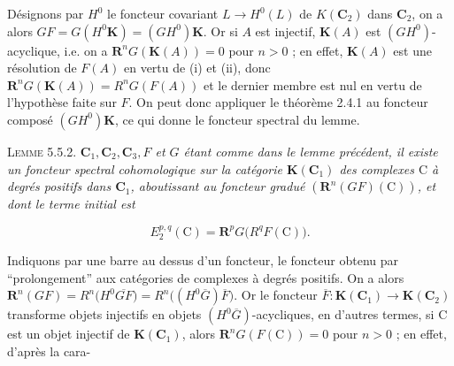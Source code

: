 Désignons par $H^0$ le foncteur covariant $L\to H^0(L)$ de
$K({\mathbf C}_2)$ dans ${\mathbf C}_2$, on a alors
$GF=G(H^0\mathbf K)=(GH^0)\mathbf K$. Or si $A$ est injectif, $\mathbf K(A)$
est $(GH^0)$-acyclique, i.e. on a ${\mathbf R}^nG(\mathbf K(A))=0$ pour $n>0$ ; en
effet, $\mathbf K(A)$ est une résolution de $F(A)$ en vertu de (i) et (ii),
donc ${\mathbf R}^nG(\mathbf K(A))=R^nG(F(A))$ et le dernier membre est nul en vertu de
l'hypothèse faite sur $F$. On peut donc appliquer le théorème 2.4.1 au
foncteur composé $(GH^0)\mathbf K$, ce qui donne le foncteur spectral du lemme.

\textsc{Lemme 5.5.2.} \textit{${\mathbf C}_1,{\mathbf C}_2,{\mathbf C}_3,F$ et $G$ étant comme
dans le lemme précédent, il existe un foncteur spectral cohomologique sur la
catégorie $\mathbf K({\mathbf C}_1)$ des complexes $\mathrm C$ à degrés positifs dans ${\mathbf C}_1$,
aboutissant au foncteur gradué $({\mathbf R}^n(GF)(\mathrm C))$, et dont le terme initial est}

\[
\tag{5.5.2}
E_2^{p,q}(\mathrm C)={\mathbf R}^pG\bigl(R^qF(\mathrm C)\bigr).
\]

Indiquons par une barre au dessus d'un foncteur, le foncteur obtenu par
``prolongement'' aux catégories de complexes à degrés positifs. On a alors
${\mathbf R}^n(GF)=R^n\bigl(H^0\overline{GF}\bigr)=R^n\bigl((H^0\overline G)\overline F\bigr)$.
Or le foncteur $\overline F:\mathbf K({\mathbf C}_1)\to\mathbf K({\mathbf C}_2)$
transforme objets injectifs en objets $(H^0\overline G)$-acycliques, en
d'autres termes, si $\mathrm C$ est un objet injectif de $\mathbf K({\mathbf C}_1)$, alors
${\mathbf R}^nG(F(\mathrm C))=0$ pour $n>0$ ; en effet, d'après la cara-

